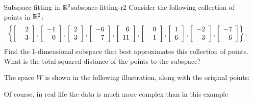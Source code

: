 \documentclass{ximera}
\begin{document}
\begin{example}{Subspace fitting in $\R^2$}{subspace-fitting-r2}
  Consider the following collection of points in $\R^2$:
  \begin{equation*}
    \set{
      \startmat{r}  2 \\ -3 \stopmat,
      \startmat{r} -1 \\  0 \stopmat,
      \startmat{r}  2 \\  3 \stopmat,
      \startmat{r} -6 \\ -7 \stopmat,
      \startmat{r}  6 \\ 11 \stopmat,
      \startmat{r}  0 \\ -1 \stopmat,
      \startmat{r}  1 \\  6 \stopmat,
      \startmat{r} -2 \\ -3 \stopmat,
      \startmat{r} -7 \\ -6 \stopmat
    }.
  \end{equation*}
  Find the 1-dimensional subspace that best approximates this
  collection of points. What is the total squared distance of the
  points to the subspace?
\end{example}


  The space $W$ is shown in the following illustration, along with the
  original points:
  \begin{center}
  \end{center}
  Of course, in real life the data is much more complex than in this example
\end{document}
